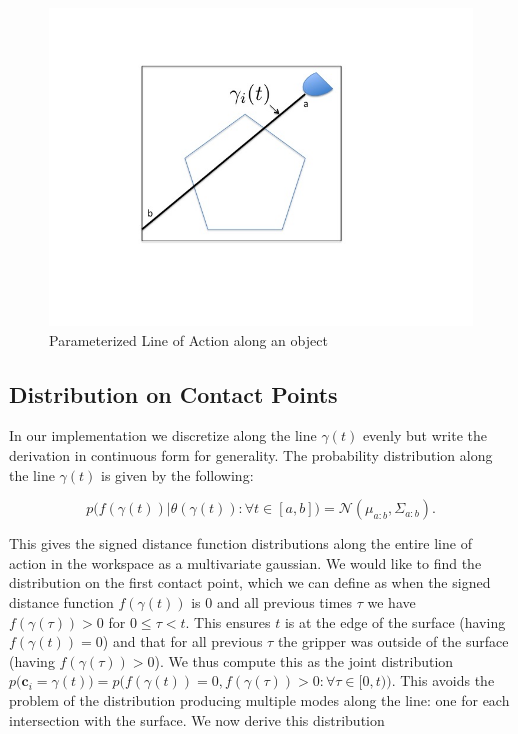 \documentclass[letterpaper, 10 pt, conference]{ieeeconf}  %
\newcommand{\mN}{\mathcal{N}}
\begin{document}
\begin{figure}[ht!]
\centering
\includegraphics[scale = 0.3]{figures/Slide1.jpg}
\caption{Parameterized Line of Action along an object}
\vspace*{-10pt}
\label{fig:line_of_action}
\end{figure}
\subsection{Distribution on Contact Points} 
In our implementation we discretize along the line $\gamma(t)$ evenly but write the derivation in continuous form for generality.
The probability distribution along the line $\gamma(t)$ is given by the following:

\begin{equation}
p\big(f(\gamma(t))|\theta(\gamma(t)): \forall t \in [a,b] \big) 
=
\mN(\mu_{a:b},\Sigma_{a:b}).
\end{equation}

This gives the signed distance function distributions along the entire line of action in the workspace as a multivariate gaussian.
We would like to find the distribution on the first contact point, which we can define as when the signed distance function $f(\gamma(t))$ is $0$ and all previous times $\tau$ we have $f(\gamma(\tau)) > 0$ for $0 \leq \tau < t$.
This ensures $t$ is at the edge of the surface (having $f(\gamma(t)) = 0$) and that for all previous $\tau$ the gripper was outside of the surface (having $f(\gamma(\tau)) > 0$).
We thus compute this as the joint distribution $p\big(\textbf{c}_i= \gamma(t)\big) = p\big(f(\gamma(t))=0, f(\gamma(\tau))> 0: \forall \tau \in [0,t)\big)$.
This avoids the problem of the distribution producing multiple modes along the line: one for each intersection with the surface.
We now derive this distribution 
\end{document}
